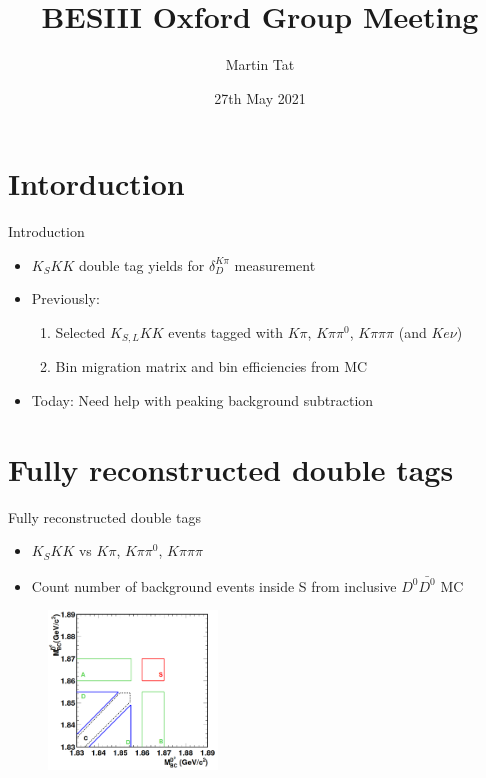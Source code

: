 \documentclass{beamer}
\title[BESIII Oxford]{BESIII Oxford Group Meeting}
\author{Martin Tat}
\institute{Oxford LHCb}
\date{27th May 2021}
\begin{document}
\begin{frame}
  \titlepage
\end{frame}


\section{Intorduction}
\begin{frame}{Introduction}
  \begin{itemize}
    \setlength\itemsep{2em}
    \item{$K_SKK$ double tag yields for $\delta_D^{K\pi}$ measurement}
    \item{Previously:}
    \begin{enumerate}
      \item{Selected $K_{S, L}KK$ events tagged with $K\pi$, $K\pi\pi^0$, $K\pi\pi\pi$ (and $Ke\nu$)}
      \item{Bin migration matrix and bin efficiencies from MC}
    \end{enumerate}
    \item{Today: Need help with peaking background subtraction}
  \end{itemize}
\end{frame}

\section{Fully reconstructed double tags}
\begin{frame}{Fully reconstructed double tags}
  \begin{itemize}
    \setlength\itemsep{2em}
    \item{$K_SKK$ vs $K\pi$, $K\pi\pi^0$, $K\pi\pi\pi$}
    \item{Count number of background events inside S from inclusive $D^0\bar{D^0}$ MC}
  \end{itemize}
  \begin{figure}
    \centering
    \includegraphics[width=0.40\textwidth]{MBC2D.png}
  \end{figure}
\end{frame}
\end{document}
